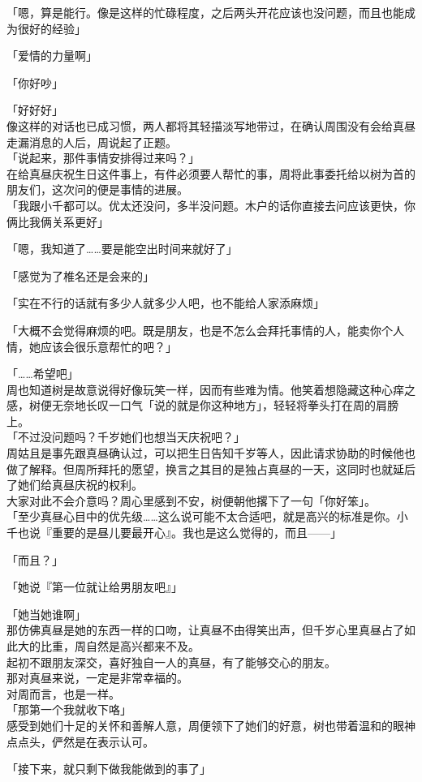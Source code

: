 「嗯，算是能行。像是这样的忙碌程度，之后两头开花应该也没问题，而且也能成为很好的经验」

「爱情的力量啊」

「你好吵」

「好好好」\\

像这样的对话也已成习惯，两人都将其轻描淡写地带过，在确认周围没有会给真昼走漏消息的人后，周说起了正题。\\

「说起来，那件事情安排得过来吗？」\\

在给真昼庆祝生日这件事上，有件必须要人帮忙的事，周将此事委托给以树为首的朋友们，这次问的便是事情的进展。\\

「我跟小千都可以。优太还没问，多半没问题。木户的话你直接去问应该更快，你俩比我俩关系更好」

「嗯，我知道了……要是能空出时间来就好了」

「感觉为了椎名还是会来的」

「实在不行的话就有多少人就多少人吧，也不能给人家添麻烦」

「大概不会觉得麻烦的吧。既是朋友，也是不怎么会拜托事情的人，能卖你个人情，她应该会很乐意帮忙的吧？」

「……希望吧」\\

周也知道树是故意说得好像玩笑一样，因而有些难为情。他笑着想隐藏这种心痒之感，树便无奈地长叹一口气「说的就是你这种地方」，轻轻将拳头打在周的肩膀上。\\

「不过没问题吗？千岁她们也想当天庆祝吧？」\\

周姑且是事先跟真昼确认过，可以把生日告知千岁等人，因此请求协助的时候他也做了解释。但周所拜托的愿望，换言之其目的是独占真昼的一天，这同时也就延后了她们给真昼庆祝的权利。\\

大家对此不会介意吗？周心里感到不安，树便朝他撂下了一句「你好笨」。\\

「至少真昼心目中的优先级……这么说可能不太合适吧，就是高兴的标准是你。小千也说『重要的是昼儿要最开心』。我也是这么觉得的，而且——」

「而且？」

「她说『第一位就让给男朋友吧』」

「她当她谁啊」\\

那仿佛真昼是她的东西一样的口吻，让真昼不由得笑出声，但千岁心里真昼占了如此大的比重，周自然是高兴都来不及。\\

起初不跟朋友深交，喜好独自一人的真昼，有了能够交心的朋友。\\

那对真昼来说，一定是非常幸福的。\\

对周而言，也是一样。\\

「那第一个我就收下咯」\\

感受到她们十足的关怀和善解人意，周便领下了她们的好意，树也带着温和的眼神点点头，俨然是在表示认可。\\

\vspace{2\baselineskip}

「接下来，就只剩下做我能做到的事了」
